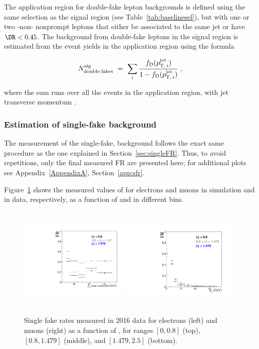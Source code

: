 The application region for double-fake lepton backgrounds 
is defined using the same selection as the signal region (see
Table~\ref{tab:baselinesel}), but with one or two \lD -non-\tD
nonprompt leptons that either be associated to the same jet or have $\DR<0.45$. 
The background from double-fake leptons in the signal region is
estimated from the event yields in the application region using
the formula
\begin{linenomath}
  \begin{equation}
    \label{eq:dFRbkg}
    N_{\mathrm{double\: fakes}}^{\mathrm{sig}} ~=~ 
    \sum_i\frac{f_{\mathrm{D}}(p_{\mathrm{T,\,}i}^{\mathrm{jet}})}{1-f_{\mathrm{D}}(p_{\mathrm{T,\,}i}^{\mathrm{jet}})}\;,
  \end{equation}
\end{linenomath}
where the sum runs over all the events in the application region, with jet transverse momentum .
\subsubsection{Estimation of single-fake background}
\label{sec:singleFakeBkg}

The measurement of the single-fake, \sfr background follows the exact same
procedure as the one explained in Section~\ref{sec:singleFR}. Thus, to
avoid repetitions, only the final measured FR are presented here; for
additional plots see Appendix~\ref{AppendixA}, Section~\ref{app:sfr}.

Figure~\ref{fig:sfr_data} shows the measured
values of \sfr for electrons and muons in simulation and in data,
respectively, as a function of \ptc and in different \abseta bins.
\begin{figure}[h]
  \centering
  \includegraphics[height=5cm, width=5.4cm]{Figures/c6/backgrounds/FR/sFR/data/electrons.pdf}
  \includegraphics[height=5cm, width=5.4cm]{Figures/c6/backgrounds/FR/sFR/data/muons.pdf}\\
  \caption{Single fake rates measured in 2016 data for electrons (left) and
    muons (right) as a function of \ptc, for \abseta ranges $[0,0.8]$
    (top), $[0.8,1.479]$ (middle), and $[1.479,2.5]$ (bottom).}
  \label{fig:sfr_data}
\end{figure}

